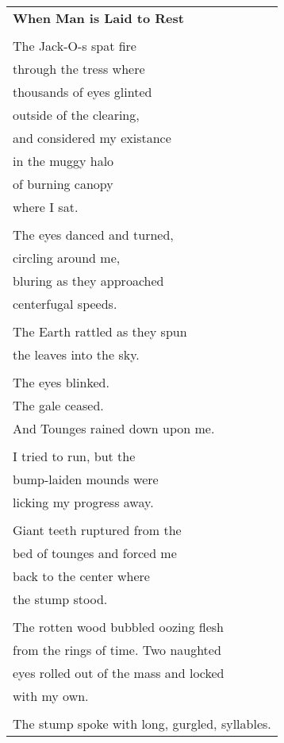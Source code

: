 \documentclass{article}
\begin{document}
\begin{center}
\begin{tabular}{l}
\textbf{When Man is Laid to Rest} \\
\\
The Jack-O-s spat fire \\
through the tress where \\
thousands of eyes glinted \\
outside of the clearing, \\
and considered my existance \\
in the muggy halo \\
of burning canopy \\
where I sat. \\
\\
The eyes danced and turned, \\
circling around me, \\
bluring as they approached \\
centerfugal speeds. \\
\\
The Earth rattled as they spun \\
the leaves into the sky. \\
\\
The eyes blinked. \\
The gale ceased. \\
And Tounges rained down upon me. \\
\\
I tried to run, but the \\
bump-laiden mounds were \\
licking my progress away. \\
\\
Giant teeth ruptured from the \\
bed of tounges and forced me \\
back to the center where \\
the stump stood. \\
\\
The rotten wood bubbled oozing flesh \\
from the rings of time.  Two naughted \\
eyes rolled out of the mass and locked \\
with my own. \\
\\
The stump spoke with long, gurgled, syllables. \\ %
\end{tabular}

\end{center}
\end{document}
